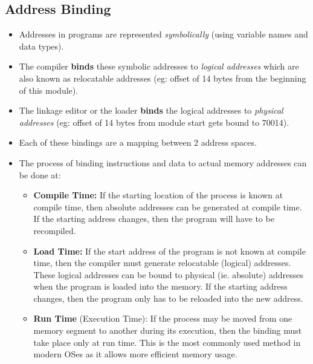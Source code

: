 \documentclass{article}
\theoremstyle{plain}
\theoremstyle{definition}
\begin{document}
\subsection{Address Binding}
\begin{itemize}
    \item Addresses in programs are represented \textit{symbolically} (using variable names and data types).
    
    \item The compiler \textbf{binds} these symbolic addresses to \textit{logical addresses} which are also known as relocatable addresses (eg: offset of 14 bytes from the beginning of this module).
    
    \item The linkage editor or the loader \textbf{binds} the logical addresses to \textit{physical addresses} (eg: offset of 14 bytes from module start gets bound to 70014).
    
    \item Each of these bindings are a mapping between 2 address spaces.
    
    \item The process of binding instructions and data to actual memory addresses can be done at:
    
    \begin{itemize}
        \item \textbf{Compile Time:} If the starting location of the process is known at compile time, then absolute addresses can be generated at compile time. If the starting address changes, then the program will have to be recompiled.
        
        \item \textbf{Load Time:} If the start address of the program is not known at compile time, then the compiler must generate relocatable (logical) addresses. These logical addresses can be bound to physical (ie. absolute) addresses when the program is loaded into the memory. If the starting address changes, then the program only has to be reloaded into the new address. 
        
        \item \textbf{Run Time} (Execution Time): If the process may be moved from one memory segment to another during its execution, then the binding must take place only at run time. This is the most commonly used method in modern OSes as it allows more efficient memory usage.
    \end{itemize}
\end{itemize}
\end{document}
